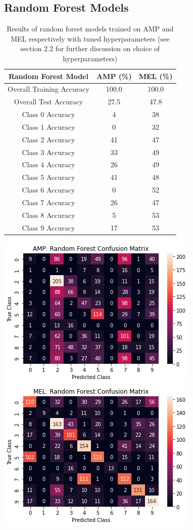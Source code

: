 \documentclass[11pt]{article}
\begin{document}
\subsection{Random Forest Models}

\begin{table}[H]
\centering
\caption{Results of random forest models trained on AMP and MEL respectively with tuned hyperparameters (see section 2.2 for further discussion on choice of hyperparameters)}
\begin{tabular}{|c|c|c|}
 \toprule
 Random Forest Model & AMP (\%) & MEL (\%)\\
 \midrule
 Overall Training Accuracy & 100.0 & 100.0 \\
 Overall Test Accuracy & 27.5 & 47.8 \\
 Class 0 Accuracy & 4 & 38\\
 Class 1 Accuracy & 0 & 32\\
 Class 2 Accuracy & 41 & 47\\
 Class 3 Accuracy & 33 & 49\\
 Class 4 Accuracy & 26 & 49\\
 Class 5 Accuracy & 41 & 48\\
 Class 6 Accuracy & 0 & 52\\
 Class 7 Accuracy & 26 & 47\\
 Class 8 Accuracy & 5 & 53\\
 Class 9 Accuracy & 17 & 53\\
 \bottomrule
\end{tabular}
\end{table}
\begin{center}
    \includegraphics[width=0.45\linewidth]{cfm_rf_amp.png}
    \includegraphics[width=0.45\linewidth]{cfm_rf_mel.png}
\end{center}
\end{document}
